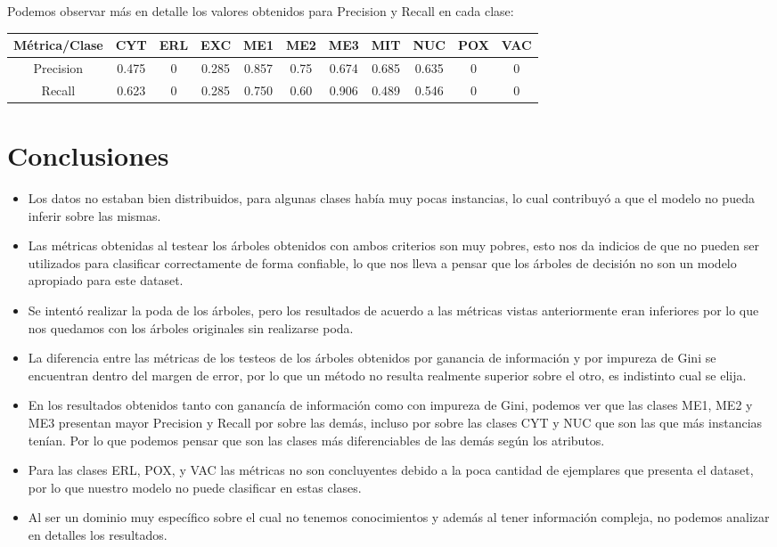 \documentclass[11pt]{article}
\begin{document}
Podemos observar más en detalle los valores obtenidos para Precision y Recall en cada clase:

\begin{table}[h!]
  \begin{center}
    \begin{tabular}{|c|c|c|c|c|c|c|c|c|c|c|}
      \hline
      Métrica/Clase & CYT    & ERL & EXC   & ME1  & ME2   & ME3   & MIT   & NUC   & POX & VAC \\ \hline
      Precision     & 0.475  & 0   & 0.285 & 0.857 & 0.75 & 0.674 & 0.685 & 0.635 & 0   &  0  \\ \hline
      Recall        & 0.623  & 0   & 0.285 & 0.750 & 0.60 & 0.906 & 0.489 & 0.546 & 0   &  0  \\ \hline
    \end{tabular}
  \end{center}
\end{table}

\section*{Conclusiones}

\begin{itemize}
  \item Los datos no estaban bien distribuidos, para algunas clases había muy
  pocas instancias, lo cual contribuyó a que el modelo no pueda inferir sobre las mismas.
  \item Las métricas obtenidas al testear los árboles obtenidos con ambos criterios son muy pobres,
  esto nos da indicios de que no pueden ser utilizados para clasificar correctamente 
  de forma confiable, lo que nos lleva a pensar que los árboles de decisión no son
  un modelo apropiado para este dataset.
  \item Se intentó realizar la poda de los árboles, pero los resultados de acuerdo
  a las métricas vistas anteriormente eran inferiores por lo que nos quedamos
  con los árboles originales sin realizarse poda.
  \item La diferencia entre las métricas de los testeos de los árboles obtenidos
  por ganancia de información y por impureza de Gini se encuentran dentro
  del margen de error, por lo que un método no resulta realmente superior sobre el otro,
  es indistinto cual se elija.
  \item En los resultados obtenidos tanto con ganancía de información como con impureza de Gini, podemos
  ver que las clases ME1, ME2 y ME3 presentan mayor Precision y Recall por sobre las demás, incluso
  por sobre las clases CYT y NUC que son las que más instancias tenían. Por lo que
  podemos pensar que son las clases más diferenciables de las demás según los atributos.
  \item Para las clases ERL, POX, y VAC las métricas no son concluyentes debido a la poca cantidad
  de ejemplares que presenta el dataset, por lo que nuestro modelo no puede clasificar en estas clases.
  \item Al ser un dominio muy específico sobre el cual no tenemos conocimientos y además
  al tener información compleja, no podemos analizar en detalles los resultados.
\end{itemize}
\end{document}

